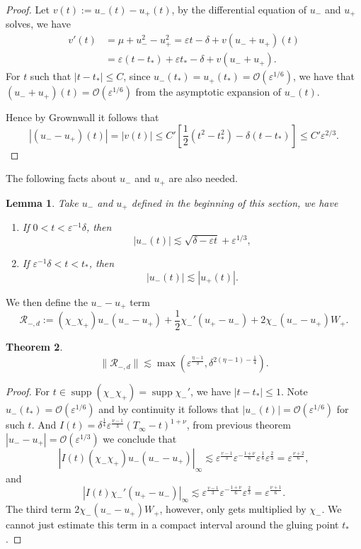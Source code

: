 \documentclass[letterpaper,11pt]{article}
\newcommand{\rmO}{\mathcal{O}}
\newcommand{\eps}{\varepsilon}
\newcommand{\lar}{ \lesssim }
\newcommand{\supp}{\operatorname{supp}}
\numberwithin{equation}{section}
\theoremstyle{plain}
\newtheorem{theorem}{Theorem}[section]
\newtheorem{lemma}[theorem]{Lemma}
\begin{document}
\begin{enumerate}
\begin{itemize}
\begin{enumerate}
\begin{proof}
Let $v(t):= u_-(t)-u_+(t)$, by the differential equation of $u_-$ and $u_+$ solves, we have
\begin{align*}
v'(t) &= \mu+u_-^2-u_+^2 = \eps t -\delta + v(u_-+u_+)(t)\\
&=\eps(t-t_*)+\eps t_* -\delta + v (u_-+u_+).
\end{align*}
For $t$ such that $|t-t_*|\le C$, since $u_-(t_*)=u_+(t_*) = \rmO(\eps^{1/6})$, we have  that $(u_-+u_+)(t) =\rmO(\eps^{1/6})$ from the asymptotic expansion of $u_-(t)$.

Hence by Grownwall it follows that
\[
\left |(u_--u_+)(t)\right |=|v(t)| \le C' \left[\frac{1}{2}(t^2-t_*^2)-\delta(t-t_*)\right] \le C'\eps^{2/3}.
\]
\end{proof}

The following facts about $u_-$ and $u_+$ are also needed.
\begin{lemma}\label{u_-est}
Take $u_-$ and $u_+$ defined in the beginning of this section, we have
\begin{enumerate}
\item If $0<t<\eps^{-1}\delta$, then
\[
 |u_-(t)| \lar \sqrt{\delta-\eps t}+\eps^{1/3},
 \]
 \item If $\eps^{-1}\delta < t <t_*$, then
 \[
 |u_-(t)|\lar |u_+(t)|.
 \]
\end{enumerate}
\end{lemma}

We then define the $u_--u_+$ term
\[
\mathcal{R}_{-,d} :=  (\chi_-\chi_+)u_-(u_--u_+) +\frac{1}{2}\chi_-'(u_+-u_-) + 2\chi_-(u_- -u_+)W_+ .
\]

\begin{theorem}
\[
\| \mathcal{R}_{-,d} \| \lar \max(\eps^{\frac{\eta-1}{3}}, \delta^{2(\eta-1)-\frac{1}{4}} ).
\]
\end{theorem}
\begin{proof}
For $t\in \supp (\chi_-\chi_+) = \supp \chi_-'$, we have $|t-t_*| \le 1$. Note $u_-(t_*) = \rmO(\eps^{1/6})$ and by continuity it follows that $|u_-(t)| = \rmO(\eps^{1/6})$ for such $t$. And $I(t)=\delta^{\frac{1}{4}}\eps^{\frac{\nu-1}{3}}(T_\infty-t)^{1+\nu}$, from previous theorem $|u_- - u_+| = \rmO(\eps^{1/3})$ we conclude that
\[
|I(t) (\chi_-\chi_+)u_-(u_--u_+)|_\infty \lar \eps^{\frac{v-1}{3}} \eps^{-\frac{1+\nu}{6}} \eps^{\frac{1}{6}}\eps^{\frac{2}{3}} = \eps^{\frac{\nu+2}{6}},
\]
 and
\[
|I(t) \chi_-'(u_+-u_-) |_\infty \lar\eps^{\frac{v-1}{3}} \eps^{-\frac{1+\nu}{6}} \eps^{\frac{2}{3}} = \eps^{\frac{\nu+1}{6}}.
\]
 The third term $2\chi_-(u_- -u_+)W_+$, however, only gets multiplied by $\chi_-$. We cannot just estimate this term in a compact interval around the gluing point $t_*$. 


\end{proof}
\end{enumerate}
\end{itemize}
\end{enumerate}
\end{document}

